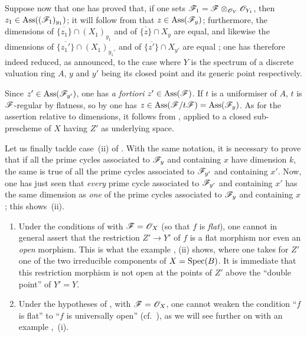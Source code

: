 \begin{env}[12.1.1.4]
Suppose now that one has proved that, if one sets $\mathscr{F}_1=\mathscr{F}\otimes_{\mathscr{O}_Y}\mathscr{O}_{Y_1}$, then $z_1\in\operatorname{Ass}((\mathscr{F}_1)_{y_1})$; it will follow from  that $z\in\operatorname{Ass}(\mathscr{F}_y)$; furthermore, the dimensions of $\overline{\{z_1\}}\cap(X_1)_{y_1}$ and of $\overline{\{z\}}\cap X_y$ are equal, and likewise the dimensions of $\overline{\{z_1'\}}\cap(X_1)_{y_1'}$ and of $\overline{\{z'\}}\cap X_{y'}$ are equal ; one has therefore indeed reduced, as announced, to the case where $Y$ is the spectrum of a discrete valuation ring $A$, $y$ and $y'$ being its closed point and its generic point respectively.

Since $z'\in\operatorname{Ass}(\mathscr{F}_{y'})$, one has \emph{a fortiori} $z'\in\operatorname{Ass}(\mathscr{F})$.
If $t$ is a uniformiser of $A$, $t$ is $\mathscr{F}$-regular by flatness, so by  one has $z\in\operatorname{Ass}(\mathscr{F}/t\mathscr{F})=\operatorname{Ass}(\mathscr{F}_y)$.
As for the assertion relative to dimensions, it follows from , applied to a closed sub-prescheme of $X$ having $Z'$ as underlying space.

Let us finally tackle case~(ii) of .
With the same notation, it is necessary to prove that if all the prime cycles associated to $\mathscr{F}_y$ and containing $x$ have dimension $k$, the same is true of all the prime cycles associated to $\mathscr{F}_{y'}$ and containing $x'$.
Now, one has just seen that \emph{every} prime cycle associated to $\mathscr{F}_{y'}$ and containing $x'$ has the same dimension as \emph{one} of the prime cycles associated to $\mathscr{F}_y$ and containing $x$; this shows~(ii).
\end{env}

\begin{remarks}[12.1.2]
\label{IV.12.1.2}
\begin{enumerate}[label=(\roman*)]
  \item Under the conditions of  with $\mathscr{F}=\mathscr{O}_X$ (so that $f$ is \emph{flat}), one cannot in general assert that the restriction $Z'\to Y'$ of $f$ is a flat morphism nor even an \emph{open} morphism.
This is what the example ,
(ii) shows, where one takes for $Z'$ one of the two irreducible components of $X=\operatorname{Spec}(B)$.
It is immediate that this restriction morphism is not open at the points of $Z'$ above the ``double point'' of $Y'=Y$.

  \item Under the hypotheses of , with $\mathscr{F}=\mathscr{O}_X$, one cannot weaken the condition ``$f$ is flat'' to ``$f$ is universally open'' (cf.\ ), as we will see further on with an example ,~(i).
\end{enumerate}
\end{remarks}

